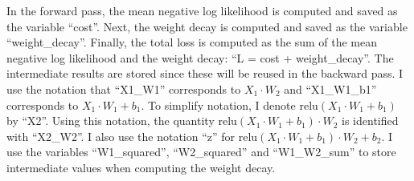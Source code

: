 \documentclass{article}
\begin{document}
In the forward pass, the mean negative log likelihood is computed and saved as the variable ``cost''. 
Next, the weight decay is computed and saved as the variable ``weight\_decay''. 
Finally, the total loss is computed as the sum of the mean negative log likelihood and the weight decay: ``L = cost + weight\_decay''.
The intermediate results are stored since these will be reused in the backward pass.
I use the notation that ``X1\_W1'' corresponds to $X_1 \cdot W_2$ and ``X1\_W1\_b1'' corresponds to $X_1 \cdot W_1 + b_1$.
To simplify notation, I denote $\mathrm{relu}(X_1 \cdot W_1 + b_1)$ by ``X2''.
Using this notation, the quantity $\mathrm{relu}(X_1 \cdot W_1 + b_1) \cdot W_2$ is identified with ``X2\_W2''.
I also use the notation ``z'' for $\mathrm{relu}(X_1 \cdot W_1 + b_1) \cdot W_2 + b_2$.
I use the variables ``W1\_squared'', ``W2\_squared'' and ``W1\_W2\_sum'' to store intermediate values when computing the weight decay.
\end{document}
